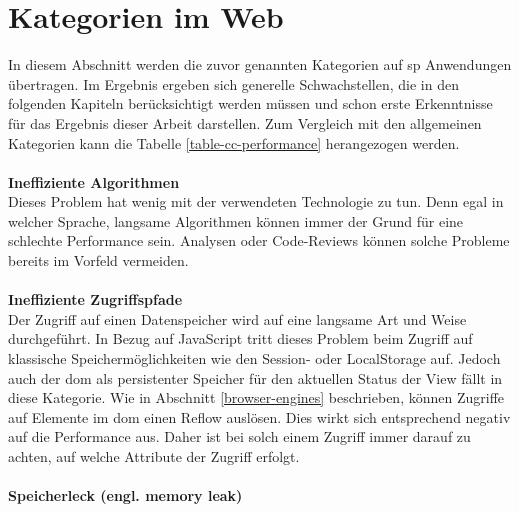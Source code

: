 \section{Kategorien im Web}
\label{performance-categories-web}

In diesem Abschnitt werden die zuvor genannten Kategorien auf \gls{sp} Anwendungen übertragen. Im Ergebnis ergeben sich generelle Schwachstellen, die in den folgenden Kapiteln berücksichtigt werden müssen und schon erste Erkenntnisse für das Ergebnis dieser Arbeit darstellen. Zum Vergleich mit den allgemeinen Kategorien kann die Tabelle \ref{table-cc-performance} herangezogen werden.
\\\\
\textbf{Ineffiziente Algorithmen}
\\
Dieses Problem hat wenig mit der verwendeten Technologie zu tun. Denn egal in welcher Sprache, langsame Algorithmen können immer der Grund für eine schlechte Performance sein.  Analysen oder Code-Reviews können solche Probleme bereits im Vorfeld vermeiden.
\\\\
\textbf{Ineffiziente Zugriffspfade}
\\
Der Zugriff auf einen Datenspeicher wird auf eine langsame Art und Weise durchgeführt. In Bezug auf JavaScript tritt dieses Problem beim Zugriff auf klassische Speichermöglichkeiten wie den Session- oder \gls{LocalStorage} auf. Jedoch auch der \gls{dom} als persistenter Speicher für den aktuellen Status der View fällt in diese Kategorie. Wie in Abschnitt \ref{browser-engines} beschrieben, können Zugriffe auf Elemente im \gls{dom} einen \gls{Reflow} auslösen. Dies wirkt sich entsprechend negativ auf die Performance aus. Daher ist bei solch einem Zugriff immer darauf zu achten, auf welche Attribute der Zugriff erfolgt. 
\\\\
\textbf{Speicherleck (engl. \glqq memory leak\grqq)}
\\

